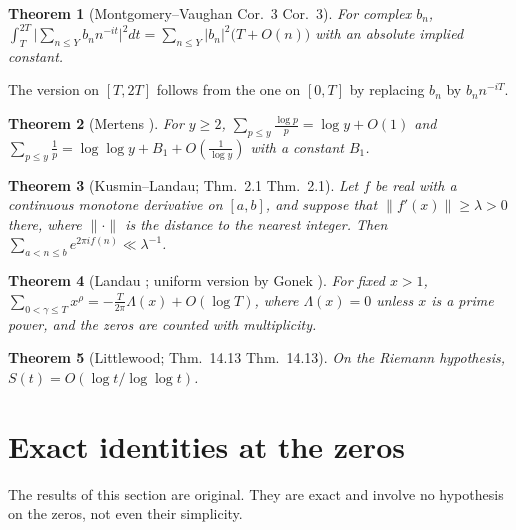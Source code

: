 \documentclass[11pt,reqno]{amsart}
\makeatletter
\let\CG@origcite\cite
\renewcommand*{\cite}[2][]{\def\CG@citekey{#2}%
  \ifx\relax#1\relax\CG@origcite{#2}\else\CG@origcite[#1]{#2}\fi}
\numberwithin{equation}{section}
\theoremstyle{plain}
\newtheorem{theorem}{Theorem}[section]
\theoremstyle{definition}
\theoremstyle{remark}
\makeatother
\begin{document}
\begin{theorem}[Montgomery--Vaughan {\cite[Cor.~3]{MontgomeryVaughan1974}}]\label{thm:known_MV}
For complex $b_n$, $\int_T^{2T}\bigl|\sum_{n\le Y}b_nn^{-it}\bigr|^2dt=\sum_{n\le Y}|b_n|^2\bigl(T+O(n)\bigr)$ with an absolute implied constant.
\end{theorem}
The version on $[T,2T]$ follows from the one on $[0,T]$ by replacing $b_n$ by $b_nn^{-iT}$.

\begin{theorem}[Mertens {\cite{Mertens1874}}]\label{thm:known_mertens}
For $y\ge2$, $\sum_{p\le y}\frac{\log p}p=\log y+O(1)$ and $\sum_{p\le y}\frac1p=\log\log y+B_1+O(\frac1{\log y})$ with a constant $B_1$.
\end{theorem}

\begin{theorem}[Kusmin--Landau; {\cite[Thm.~2.1]{GrahamKolesnik1991}}]\label{thm:known_KL}
Let $f$ be real with a continuous monotone derivative on $[a,b]$, and suppose that $\|f'(x)\|\ge\lambda>0$ there, where $\|\cdot\|$ is the distance to the nearest integer. Then $\sum_{a<n\le b}e^{2\pi if(n)}\ll\lambda^{-1}$.
\end{theorem}

\begin{theorem}[Landau {\cite{Landau1912}}; uniform version by Gonek {\cite{Gonek1993}}]\label{thm:known_landau}
For fixed $x>1$, $\sum_{0<\gamma\le T}x^{\rho}=-\frac T{2\pi}\Lambda(x)+O(\log T)$, where $\Lambda(x)=0$ unless $x$ is a prime power, and the zeros are counted with multiplicity.
\end{theorem}

\begin{theorem}[Littlewood; {\cite[Thm.~14.13]{Titchmarsh1986}}]\label{thm:known_RH_S}
On the Riemann hypothesis, $S(t)=O(\log t/\log\log t)$.
\end{theorem}

\section{Exact identities at the zeros}
\label{sec:identities}

The results of this section are original. They are exact and involve no hypothesis on the zeros, not even their simplicity.
\end{document}
